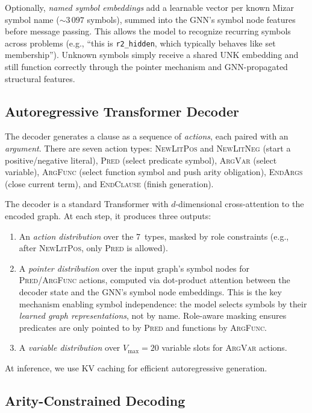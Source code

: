 \documentclass{easychair}
\begin{document}
Optionally, \emph{named symbol embeddings} add a learnable vector per
known Mizar symbol name (${\sim}3\,097$ symbols), summed into the
GNN's symbol node features before message passing.  This allows the
model to recognize recurring symbols across problems (e.g., ``this is
\texttt{r2\_hidden}, which typically behaves like set membership'').
Unknown symbols simply receive a shared UNK embedding and still
function correctly through the pointer mechanism and GNN-propagated
structural features.

\subsection{Autoregressive Transformer Decoder}

The decoder generates a clause as a sequence of \emph{actions}, each
paired with an \emph{argument}.  There are seven action types:
\textsc{NewLitPos} and \textsc{NewLitNeg} (start a positive/negative
literal), \textsc{Pred} (select predicate symbol), \textsc{ArgVar}
(select variable), \textsc{ArgFunc} (select function symbol and push
arity obligation), \textsc{EndArgs} (close current term), and
\textsc{EndClause} (finish generation).

The decoder is a standard Transformer with $d$-dimensional
cross-attention to the encoded graph.  At each step, it produces
three outputs:
\begin{enumerate}
\item An \emph{action distribution} over the 7~types, masked by
  role constraints (e.g., after \textsc{NewLitPos}, only
  \textsc{Pred} is allowed).
\item A \emph{pointer distribution} over the input graph's symbol
  nodes for \textsc{Pred}/\textsc{ArgFunc} actions, computed via
  dot-product attention between the decoder state and the GNN's
  symbol node embeddings.  This is the key mechanism enabling
  symbol independence: the model selects symbols by their
  \emph{learned graph representations}, not by name.  Role-aware
  masking ensures predicates are only pointed to by \textsc{Pred}
  and functions by \textsc{ArgFunc}.
\item A \emph{variable distribution} over $V_{\max}=20$ variable
  slots for \textsc{ArgVar} actions.
\end{enumerate}

At inference, we use KV caching for efficient autoregressive
generation.

\subsection{Arity-Constrained Decoding}
\end{document}
